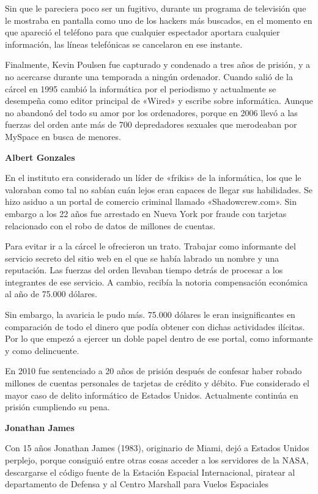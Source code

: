 \documentclass[11pt,a4paper]{article}
\begin{document}
\begin{multicols}{2}
Sin que le pareciera poco ser un fugitivo, durante un programa de televisión que le mostraba en pantalla como uno de los hackers más buscados, en el momento en que apareció el teléfono para que cualquier espectador aportara cualquier información, las líneas telefónicas se cancelaron en ese instante.

Finalmente, Kevin Poulsen fue capturado y condenado a tres años de prisión, y a no acercarse durante una temporada a ningún ordenador. Cuando salió de la cárcel en 1995 cambió la informática por el periodismo y actualmente se desempeña como editor principal de «Wired» y escribe sobre informática. Aunque no abandonó del todo su amor por los ordenadores, porque en 2006 llevó a las fuerzas del orden ante más de 700 depredadores sexuales que merodeaban por MySpace en busca de menores.

\begin{center}
\textbf{Albert Gonzales}
\end{center}
En el instituto era considerado un líder de «frikis» de la informática, los que le valoraban como tal no sabían cuán lejos eran capaces de llegar sus habilidades. Se hizo asiduo a un portal de comercio criminal llamado «Shadowcrew.com». Sin embargo a los 22 años fue arrestado en Nueva York por fraude con tarjetas relacionado con el robo de datos de millones de cuentas.

Para evitar ir a la cárcel le ofrecieron un trato. Trabajar como informante del servicio secreto del sitio web en el que se había labrado un nombre y una reputación. Las fuerzas del orden llevaban tiempo detrás de procesar a los integrantes de ese servicio. A cambio, recibía la notoria compensación económica al año de 75.000 dólares.

Sin embargo, la avaricia le pudo más. 75.000 dólares le eran insignificantes en comparación de todo el dinero que podía obtener con dichas actividades ilícitas. Por lo que empezó a ejercer un doble papel dentro de ese portal, como informante y como delincuente.

En 2010 fue sentenciado a 20 años de prisión después de confesar haber robado millones de cuentas personales de tarjetas de crédito y débito. Fue considerado el mayor caso de delito informático de Estados Unidos. Actualmente continúa en prisión cumpliendo su pena.

\begin{center}
\textbf{Jonathan James}
\end{center}
Con 15 años Jonathan James (1983), originario de Miami, dejó a Estados Unidos perplejo, porque consiguió entre otras cosas acceder a los servidores de la NASA, descargarse el código fuente de la Estación Espacial Internacional, piratear al departamento de Defensa y al Centro Marshall para Vuelos Espaciales


\end{multicols}
\end{document}

